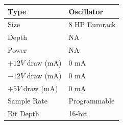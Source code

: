 \documentclass[12pt,letter]{article}
\begin{document}
\begin{table}[!htp]
\begin{tabular}{|l|l|}
\hline
Type             & Oscillator               \\
\hline
Size             & 8 HP Eurorack            \\
\hline
Depth            & NA                       \\
\hline
Power            & NA                       \\ %
\hline
$+12V$ draw (mA) & 0 mA                     \\
\hline
$-12V$ draw (mA) & 0 mA                     \\
\hline
$+5V$ draw (mA)  & 0 mA                     \\
\hline
Sample Rate      & Programmable             \\
\hline
Bit Depth        & 16-bit                   \\
\hline
\end{tabular}
\end{table}


\clearpage
\renewcommand\refname{References \& Acknowledgments}
\nocite{*}


\end{document}
